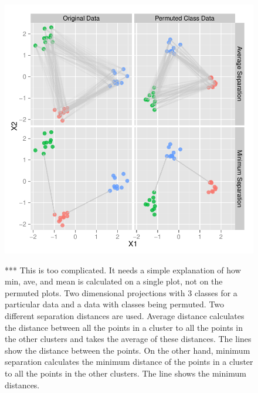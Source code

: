 \documentclass[12]{article}
\newcommand{\red}[1]{{\color{red} #1}}
\begin{document}
\begin{itemize}
\end{itemize}

\begin{figure}[hbtp]
\centering
\includegraphics[scale=0.75]{ave-min-sep.pdf}
\label{sep-dist}
	\vspace{-.1in}
\caption{\red{*** This is too complicated. It needs a simple explanation of how min, ave, and mean is calculated on a single plot, not on the permuted plots.} Two dimensional projections with 3 classes for a particular data and a data with classes being permuted. Two different separation distances are used. Average distance calculates the distance between all the points in a cluster to all the points in the other clusters and takes the average of these distances. The lines show the distance between the points.  On the other hand,  minimum separation calculates the minimum distance of the points in a cluster to all the points in the other clusters. The line shows the minimum distances.  }
\end{figure}
\end{document}
